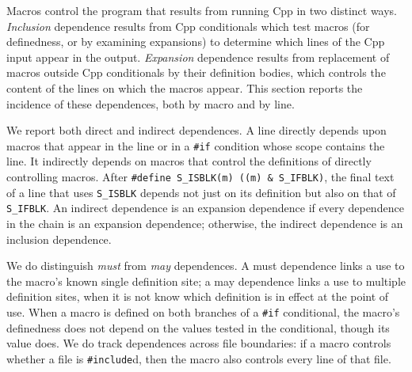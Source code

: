 \documentclass[10pt]{article}
\begin{document}
Macros control the program that results from running Cpp in two distinct
ways.  \emph{Inclusion} dependence results from Cpp conditionals which test
macros (for definedness, or by examining expansions) to determine which
lines of the Cpp input appear in the output.  \emph{Expansion} dependence
results from replacement of macros outside Cpp conditionals by their
definition bodies, which controls the content of the lines on which the
macros appear.  This section reports the incidence of these dependences,
both by macro and by line.

We report both direct and indirect dependences.  A line directly depends
upon macros that appear in the line or in a {\tt \#if} condition whose
scope contains the line.  It indirectly depends on macros that control the
definitions of directly controlling macros.  After {\tt \#define
\verb|S_ISBLK|(m) ((m)~\&~\verb|S_IFBLK|)}, the final text of a line that
uses \verb|S_ISBLK| depends not just on its definition but also on that of
\verb|S_IFBLK|.  An indirect dependence is an expansion dependence if every
dependence in the chain is an expansion dependence; otherwise, the indirect
dependence is an inclusion dependence.

We do distinguish \emph{must} from \emph{may} dependences.  A must dependence links a use
to the macro's known single definition site; a may dependence links a use
to multiple definition sites, when it is not know which definition is in
effect at the point of use.  When a macro is defined on both branches of a
{\tt \#if} conditional, the macro's definedness does not depend on the
values tested in the conditional, though its value does.  We do track
dependences across file boundaries: if a macro controls whether a file is
{\tt \#include}d, then the macro also controls every line of that file.

\end{document}
